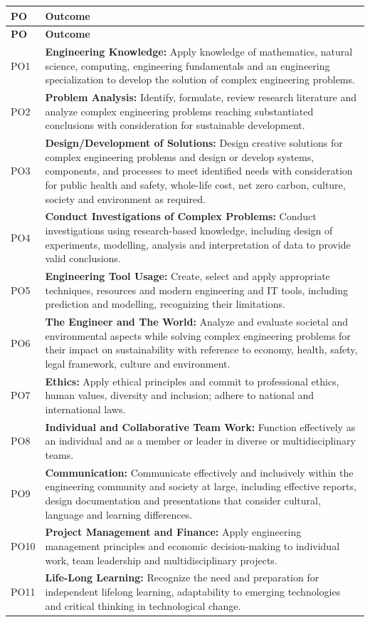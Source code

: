 \documentclass[12pt,a4paper]{article}
\begin{document}
\begin{longtable}{|p{}|p{}|}
\hline \textbf{PO} & \textbf{Outcome}\\\hline
\endfirsthead
\hline \textbf{PO} & \textbf{Outcome}\\\hline
\endhead
PO1 & \textbf{Engineering Knowledge:} Apply knowledge of mathematics, natural science, computing, engineering fundamentals and an engineering specialization to develop the solution of complex engineering problems.\\\hline
PO2 & \textbf{Problem Analysis:} Identify, formulate, review research literature and analyze complex engineering problems reaching substantiated conclusions with consideration for sustainable development.\\\hline
PO3 & \textbf{Design/Development of Solutions:} Design creative solutions for complex engineering problems and design or develop systems, components, and processes to meet identified needs with consideration for public health and safety, whole-life cost, net zero carbon, culture, society and environment as required.\\\hline
PO4 & \textbf{Conduct Investigations of Complex Problems:} Conduct investigations using research-based knowledge, including design of experiments, modelling, analysis and interpretation of data to provide valid conclusions.\\\hline
PO5 & \textbf{Engineering Tool Usage:} Create, select and apply appropriate techniques, resources and modern engineering and IT tools, including prediction and modelling, recognizing their limitations.\\\hline
PO6 & \textbf{The Engineer and The World:} Analyze and evaluate societal and environmental aspects while solving complex engineering problems for their impact on sustainability with reference to economy, health, safety, legal framework, culture and environment.\\\hline
PO7 & \textbf{Ethics:} Apply ethical principles and commit to professional ethics, human values, diversity and inclusion; adhere to national and international laws.\\\hline
PO8 & \textbf{Individual and Collaborative Team Work:} Function effectively as an individual and as a member or leader in diverse or multidisciplinary teams.\\\hline
PO9 & \textbf{Communication:} Communicate effectively and inclusively within the engineering community and society at large, including effective reports, design documentation and presentations that consider cultural, language and learning differences.\\\hline
PO10 & \textbf{Project Management and Finance:} Apply engineering management principles and economic decision-making to individual work, team leadership and multidisciplinary projects.\\\hline
PO11 & \textbf{Life-Long Learning:} Recognize the need and preparation for independent lifelong learning, adaptability to emerging technologies and critical thinking in technological change.\\\hline
\end{longtable}
\normalsize
\end{document}
